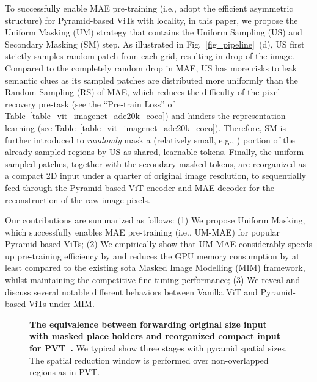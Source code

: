 \documentclass{article}
\begin{document}
To successfully enable MAE pre-training (i.e., adopt the efficient asymmetric structure) for Pyramid-based ViTs with locality, in this paper, we propose the Uniform Masking (UM) strategy that contains the Uniform Sampling (US) and Secondary Masking (SM) step. As illustrated in Fig.~\ref{fig_pipeline}~(d), US first strictly samples  random patch from each  grid, resulting in  drop of the image. Compared to the completely random  drop in MAE, US has more risks to leak semantic clues as its sampled patches are distributed more uniformly than the Random Sampling (RS) of MAE, which reduces the difficulty of the pixel recovery pre-task (see the ``Pre-train Loss'' of  Table~\ref{table_vit_imagenet_ade20k_coco}) and hinders the representation learning (see Table~\ref{table_vit_imagenet_ade20k_coco}). Therefore, SM is further introduced to \emph{randomly} mask a (relatively small, e.g., ) portion
of the already sampled regions by US as shared, learnable tokens. Finally, the uniform-sampled patches, together with the secondary-masked tokens, are reorganized as a compact 2D input under a quarter of original image resolution, to sequentially feed through the Pyramid-based ViT encoder and MAE decoder for the reconstruction of the 
raw image pixels.

Our contributions are summarized as follows: 
(1) We propose Uniform Masking, which successfully enables MAE pre-training (i.e., UM-MAE) for popular Pyramid-based ViTs; 
(2) We empirically show that UM-MAE considerably speeds up pre-training efficiency by  and reduces the GPU memory consumption by at least  compared to the existing sota Masked Image Modelling (MIM) framework, whilst maintaining the competitive fine-tuning performance; 
(3) We reveal and discuss several notable different behaviors between Vanilla ViT and Pyramid-based ViTs under MIM.



\begin{figure}[t]
	\vspace{0pt}
	\begin{center}
		\setlength{\fboxrule}{0pt}
	\end{center}	
	\vspace{-9pt}
	\caption{\textbf{The equivalence between forwarding original size input with masked place holders and reorganized compact input for PVT~\cite{wang2021pyramid}.} We typical show three stages with pyramid spatial sizes. The spatial reduction window is performed over non-overlapped regions as in PVT.
	}
	\label{fig_pvt_equivalence}
	\vspace{-12pt}
\end{figure}
\end{document}
